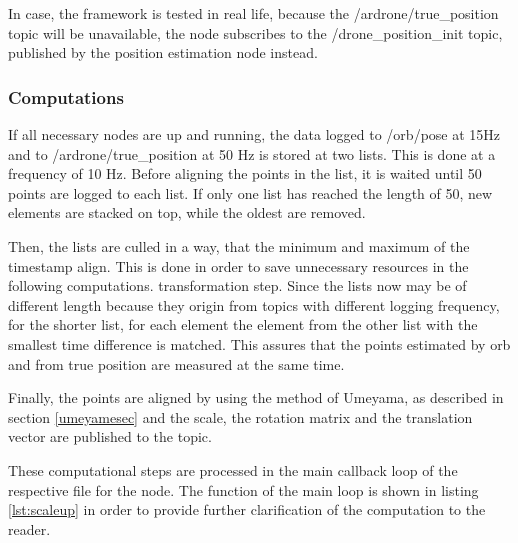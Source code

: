 	In case, the framework is tested in real life, because the /ardrone/true\_position topic will be unavailable, 
	the node subscribes to the /drone\_position\_init topic, published by the position estimation node instead. 
	
	\subsubsection{Computations}
	
	If all necessary nodes are up and running, the data  logged to /orb/pose at 15Hz and to /ardrone/true\_position at 50 Hz is stored at two lists. This is done at 
	a frequency of 10 Hz. Before aligning the points in the list, it is waited until 50 points are logged to each list. If only one list has reached 
	the length of 50, new elements are stacked on top, while the oldest are removed. 
	
	Then, the lists are culled in a way, that the minimum and maximum of the timestamp align. This is done in order to save unnecessary resources in the following computations.
	transformation step. Since the lists now may be of different length because they origin from topics with different logging frequency, 
	for the shorter list, for each element the element from the other list with the smallest time difference is matched. This assures that the points 
	estimated by orb and from true position are measured at the same time. 
	
	Finally, the points are aligned by using the method of Umeyama, as described in section \ref{umeyamesec} and the scale, the rotation matrix and the translation
    vector are published to the topic. 
	
	These computational steps are processed in the main callback loop of the respective file for the node. The function of the main loop is shown in listing \ref{lst:scaleup} in order 
	to provide further clarification of the computation to the reader. 
	
